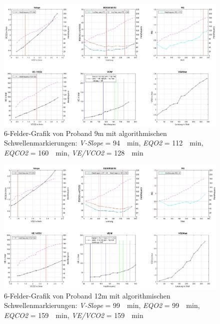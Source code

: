 %
\begin{figure}[H]
	\centering
	\noindent\includegraphics[angle=0,width=\linewidth,keepaspectratio]{Bilder/auto_9}
	\caption[6-Felder-Grafik von Proband 9m mit algorithmischen Schwellenmarkierungen]{6-Felder-Grafik von Proband 9m mit algorithmischen Schwellenmarkierungen: \textsl{V-Slope} = \SI{94}{\per\minute}, \textsl{\gls{EQO2}} = \SI{112}{\per\minute}, \textsl{\gls{EQCO2}} = \SI{160}{\per\minute}, \textsl{\gls{VE}/\gls{VCO2}} = \SI{128}{\per\minute}}
	\label{pic:pic19}
\end{figure}
%
\begin{figure}[H]
	\centering
	\noindent\includegraphics[angle=0,width=\linewidth,keepaspectratio]{Bilder/auto_12}
	\caption[6-Felder-Grafik von Proband 12m mit algorithmischen Schwellenmarkierungen]{6-Felder-Grafik von Proband 12m mit algorithmischen Schwellenmarkierungen: \textsl{V-Slope} = \SI{99}{\per\minute}, \textsl{\gls{EQO2}} = \SI{99}{\per\minute}, \textsl{\gls{EQCO2}} = \SI{159}{\per\minute}, \textsl{\gls{VE}/\gls{VCO2}} = \SI{159}{\per\minute}}
	\label{pic:pic20}
\end{figure}
